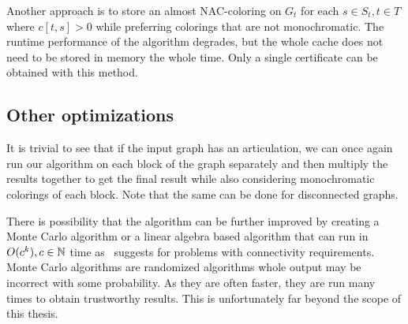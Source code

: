 Another approach is to store an almost NAC-coloring on \( G_t \)
for each \( s \in S_t, t \in T \) where \( c[t, s] > 0 \)
while preferring colorings that are not monochromatic.
The runtime performance of the algorithm degrades,
but the whole cache does not need to be stored in memory the whole time.
Only a single certificate can be obtained with this method.


\subsection{Other optimizations}

It is trivial to see that if the input graph has an articulation,
we can once again run our algorithm on each block of the graph separately
and then multiply the results together to get the final result
while also considering monochromatic colorings of each block.
Note that the same can be done for disconnected graphs.

There is possibility that the algorithm can be further improved by creating
a Monte Carlo algorithm or a linear algebra based algorithm that can run
in \( O(c^k), c \in \mathbb{N} \) time as~\cite{book_parametrized_algorithms} suggests
for problems with connectivity requirements.
Monte Carlo algorithms are randomized algorithms whole output may be incorrect
with some probability. As they are often faster, they are run many times
to obtain trustworthy results.
This is unfortunately far beyond the scope of this thesis.

